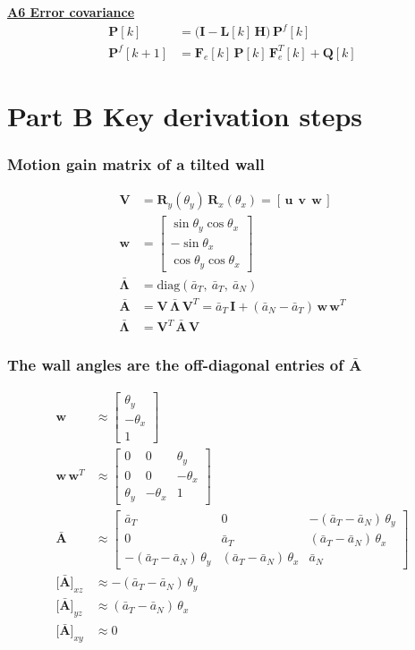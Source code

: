 \documentclass[11pt,a4paper]{ctexart}
\newcommand{\setline}[1]{\noindent{\small\textcolor[gray]{0.35}{#1}}\par\smallskip}
\newcommand{\hd}[1]{\par\bigskip\noindent\underline{\textbf{#1}}}
\newcommand{\Ab}{\bar{\mathbf A}}
\newcommand{\uu}{\mathbf u}
\newcommand{\vv}{\mathbf v}
\newcommand{\ww}{\mathbf w}
\newcommand{\aT}{\bar a_T}
\newcommand{\aN}{\bar a_N}
\newcommand{\I}{\mathbf I}
\newcommand{\V}{\mathbf V}
\newcommand{\Lb}{\bar{\boldsymbol\Lambda}}
\begin{document}
\hd{A6 \quad Error covariance}
\begin{align*}
\mathbf P[k] &= \big(\I - \mathbf L[k]\,\mathbf H\big)\,\mathbf P^f[k] \\
\mathbf P^f[k+1] &= \mathbf F_e[k]\,\mathbf P[k]\,\mathbf F_e^{T}[k] + \mathbf Q[k]
\end{align*}

\clearpage
\part*{Part B \quad Key derivation steps}

\section{Motion gain matrix of a tilted wall}
\begin{align*}
\V &= \mathbf R_y(\theta_y)\,\mathbf R_x(\theta_x) = [\,\uu\ \ \vv\ \ \ww\,] \\
\ww &= \begin{bmatrix} \sin\theta_y\cos\theta_x \\ -\sin\theta_x \\ \cos\theta_y\cos\theta_x \end{bmatrix} \\
\Lb &= \mathrm{diag}(\aT,\ \aT,\ \aN) \\
\Ab &= \V\,\Lb\,\V^{T} = \aT\,\I + (\aN - \aT)\,\ww\,\ww^{T} \\
\Lb &= \V^{T}\,\Ab\,\V
\end{align*}

\section{The wall angles are the off-diagonal entries of $\Ab$}
\setline{Small angles: drop every product of two angles.}
\begin{align*}
\ww &\approx \begin{bmatrix} \theta_y \\ -\theta_x \\ 1 \end{bmatrix} \\
\ww\,\ww^{T} &\approx \begin{bmatrix} 0 & 0 & \theta_y \\ 0 & 0 & -\theta_x \\ \theta_y & -\theta_x & 1 \end{bmatrix} \\
\Ab &\approx \begin{bmatrix}
\aT & 0 & -(\aT - \aN)\,\theta_y \\
0 & \aT & (\aT - \aN)\,\theta_x \\
-(\aT - \aN)\,\theta_y & (\aT - \aN)\,\theta_x & \aN
\end{bmatrix} \\
\big[\Ab\big]_{xz} &\approx -(\aT - \aN)\,\theta_y \\
\big[\Ab\big]_{yz} &\approx (\aT - \aN)\,\theta_x \\
\big[\Ab\big]_{xy} &\approx 0
\end{align*}
\end{document}
